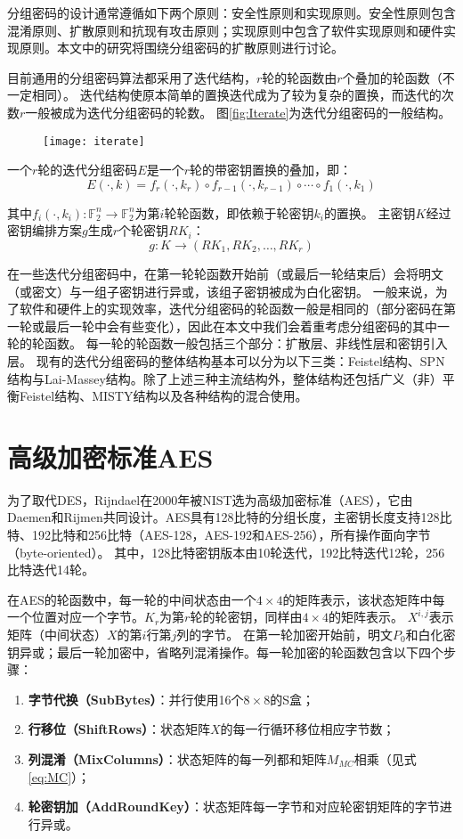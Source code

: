 分组密码的设计通常遵循如下两个原则：安全性原则和实现原则。安全性原则包含混淆原则、扩散原则和抗现有攻击原则；实现原则中包含了软件实现原则和硬件实现原则。本文中的研究将围绕分组密码的扩散原则进行讨论。

目前通用的分组密码算法都采用了迭代结构，$r$轮的轮函数由$r$个叠加的轮函数（不一定相同）。
迭代结构使原本简单的置换迭代成为了较为复杂的置换，而迭代的次数$r$一般被成为迭代分组密码的轮数。
图\ref{fig:Iterate}为迭代分组密码的一般结构。
\begin{figure}
    \centering
    \texttt{[image: iterate]}
\end{figure}
\begin{defn}[迭代分组密码]
    一个$r$轮的迭代分组密码$E$是一个$r$轮的带密钥置换的叠加，即：
    $$E(\cdot,k)=f_r(\cdot,k_r)\circ f_{r-1}(\cdot,k_{r-1})\circ\cdots\circ f_1(\cdot,k_1)$$
\end{defn}
其中$f_i(\cdot,k_i):\mathbb{F}^n_2\rightarrow\mathbb{F}^n_2$为第$i$轮轮函数，即依赖于轮密钥$k_i$的置换。
主密钥$K$经过密钥编排方案$g$生成$r$个轮密钥$RK_i$：
$$g:K\rightarrow(RK_1,RK_2,\dots,RK_r)$$

在一些迭代分组密码中，在第一轮轮函数开始前（或最后一轮结束后）会将明文（或密文）与一组子密钥进行异或，该组子密钥被成为白化密钥。
一般来说，为了软件和硬件上的实现效率，迭代分组密码的轮函数一般是相同的（部分密码在第一轮或最后一轮中会有些变化），因此在本文中我们会着重考虑分组密码的其中一轮的轮函数。
每一轮的轮函数一般包括三个部分：扩散层、非线性层和密钥引入层。
现有的迭代分组密码的整体结构基本可以分为以下三类：Feistel结构、SPN结构与Lai-Massey结构。除了上述三种主流结构外，整体结构还包括广义（非）平衡Feistel结构、MISTY结构以及各种结构的混合使用。

\section{高级加密标准AES}
为了取代DES，Rijndael在2000年被NIST选为高级加密标准（AES），它由Daemen和Rijmen共同设计。AES具有128比特的分组长度，主密钥长度支持128比特、192比特和256比特（AES-128，AES-192和AES-256），所有操作面向字节（byte-oriented）。
其中，128比特密钥版本由10轮迭代，192比特迭代12轮，256比特迭代14轮。

在AES的轮函数中，每一轮的中间状态由一个$4\times 4$的矩阵表示，该状态矩阵中每一个位置对应一个字节。$K_r$为第$r$轮的轮密钥，同样由$4\times 4$的矩阵表示。
$X^{i,j}$表示矩阵（中间状态）$X$的第$i$行第$j$列的字节。
在第一轮加密开始前，明文$P_0$和白化密钥异或；最后一轮加密中，省略列混淆操作。每一轮加密的轮函数包含以下四个步骤：
\begin{enumerate}
    \item \textbf{字节代换（SubBytes）}：并行使用16个$8\times 8$的S盒；
    \item \textbf{行移位（ShiftRows）}：状态矩阵$X$的每一行循环移位相应字节数；
    \item \textbf{列混淆（MixColumns）}：状态矩阵的每一列都和矩阵$M_{MC}$相乘（见式\ref{eq:MC}）；
    \item \textbf{轮密钥加（AddRoundKey）}：状态矩阵每一字节和对应轮密钥矩阵的字节进行异或。
\end{enumerate}

